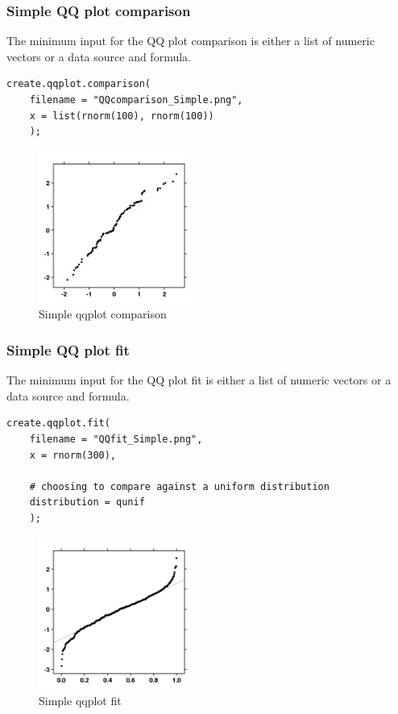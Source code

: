 \documentclass[letterpaper]{article}
\begin{document}
\subsubsection{Simple QQ plot comparison}
The minimum input for the QQ plot comparison is either a list of numeric vectors or a data source and formula.
\begin{verbatim}
create.qqplot.comparison(
    filename = "QQcomparison_Simple.png",
    x = list(rnorm(100), rnorm(100))
    );
\end{verbatim}

\begin{figure}[!ht]
  \begin{center}
     \includegraphics[width=50mm]{Figures/QQcomparison_Simple.png}
     \caption{Simple qqplot comparison}
  \end{center}
\end{figure}

\subsubsection{Simple QQ plot fit}
The minimum input for the QQ plot fit is either a list of numeric vectors or a data source and formula.

\begin{verbatim}
create.qqplot.fit(
    filename = "QQfit_Simple.png",
    x = rnorm(300),
    
    # choosing to compare against a uniform distribution
    distribution = qunif
    );
\end{verbatim}

\begin{figure}[!ht]
  \begin{center}
      \includegraphics[width=50mm]{Figures/QQfit_Simple.png}
      \caption{Simple qqplot fit}
  \end{center}
\end{figure}
\end{document}
